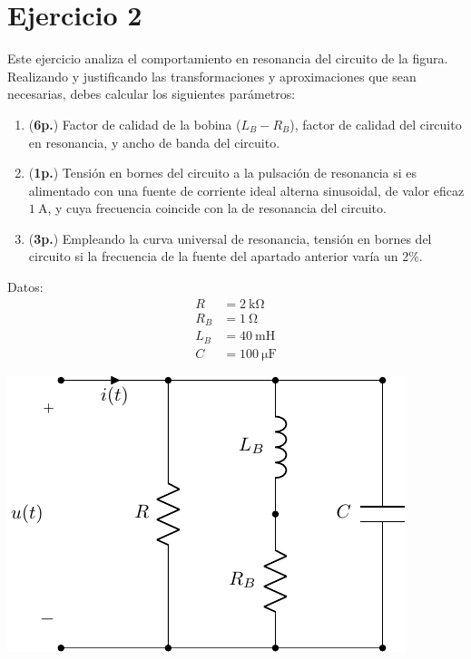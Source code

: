 \documentclass[12pt]{article}
\begin{document}
\section*{Ejercicio 2}

Este ejercicio analiza el comportamiento en resonancia del circuito de la figura. Realizando y justificando las transformaciones y aproximaciones que sean necesarias, debes calcular los siguientes parámetros:

\begin{enumerate}
\item (\textbf{6p.}) Factor de calidad de la bobina ($L_B-R_B$), factor de calidad del circuito en resonancia, y ancho de banda del circuito.
\item (\textbf{1p.}) Tensión en bornes del circuito a la pulsación de resonancia si es alimentado con una fuente de corriente ideal alterna sinusoidal, de valor eficaz $\SI{1}{\ampere}$, y cuya frecuencia coincide con la de resonancia del circuito.
\item (\textbf{3p.}) Empleando la curva universal de resonancia, tensión en bornes del circuito si la frecuencia de la fuente del apartado anterior varía un 2\%.
\end{enumerate}

\begin{minipage}{0.3\textwidth}
Datos:
\begin{align*}
  R &= \SI{2}{\kilo\ohm}\\
  R_B &= \SI{1}{\ohm}\\
  L_B &= \SI{40}{\milli\henry}\\
  C &= \SI{100}{\micro\farad}
\end{align*}
\end{minipage}
\begin{minipage}{0.7\textwidth}
\includegraphics{figs/E4_circuito_resonancia.pdf}
\end{minipage}
\end{document}
